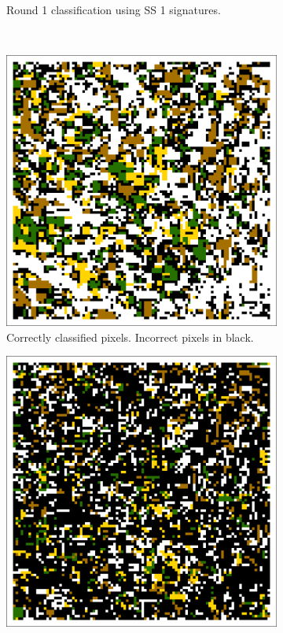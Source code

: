 \begin{figure}
\begin{subfigure}[b]{.45\textwidth}
    \caption{Round 1 classification using SS 1 signatures.}
    \label{subfig:ss1r1class}
  \end{subfigure}
  \\
  \vspace{.25in}
  \begin{subfigure}[b]{.45\textwidth}
    \includegraphics[width=\textwidth]{Graphics/Testing/clip1_MODIS_round1_correct.pdf}
    \caption{Correctly classified pixels. Incorrect pixels in black.}
    \label{subfig:ss1r1correct}
  \end{subfigure}
  \quad
  \begin{subfigure}[b]{.45\textwidth}
    \includegraphics[width=\textwidth]{Graphics/Testing/clip1_MODIS_round1_incorrect.pdf}

\end{subfigure}
\end{figure}
